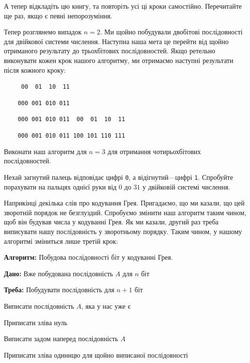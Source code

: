 \documentclass{book}
\newcommand{\algcaption}[1]{\textbf{Алгоритм:} #1.\par}
\newcommand{\alginput}[1]{\textbf{Дано:} #1\par}
\newcommand{\algoutput}[1]{\textbf{Треба:} #1\par}
\newcommand{\algstep}{\item}
\newcommand{\bitstr}[1]{{\tt #1}}
\begin{document}
\begin{exercise}
А тепер відкладіть цю книгу, та повторіть усі ці кроки самостійно. Перечитайте ще раз, якщо є певні непорозуміння.
\end{exercise}

Тепер розглянемо випадок $n=2$.
Ми щойно побудували двобітові послідовності для двійкової системи числення.
Наступна наша мета це перейти від щойно отриманого результату до трьохбітових послідовностей.
Якщо ретельно виконувати кожен крок нашого алгоритму, ми отримаємо наступні результати після кожного кроку:

\par\bitstr{~~~~~00~~01~~10~~11}\par
\par\bitstr{~~~~000~001~010~011}\par
\par\bitstr{~~~~000~001~010~011~~00~~01~~10~~11}\par
\par\bitstr{~~~~000~001~010~011~100~101~110~111}\par

\begin{exercise}
Виконати наш алгоритм для $n=3$ для отримання чотирьохбітових послідовностей.
\end{exercise}

\begin{exercise}
Нехай загнутий палець відповідає цифрі \bitstr{0}, а відігнутий---цифрі \bitstr{1}.
Спробуйте порахувати на пальцях однієї руки від $0$ до $31$ у двійковій системі числення.
\end{exercise}

Наприкінці декілька слів про кодування Грея.
Пригадаємо, що ми казали, що цей зворотній порядок не безглуздий.
Спробуємо змінити наш алгоритм таким чином, щоб він будував числа у кодуванні Грея.
Як ми казали, другий раз треба виписувати нашу послідовність у зворотньому порядку.
Таким чином, у нашому алгоритмі зміниться лише третій крок:

\begin{algorithm}
  \algcaption{Побудова послідовності біт у кодуванні Грея}
  \alginput{Вже побудована послідовність $A$ для $n$ біт}
  \algoutput{Побудувати послідовність для $n+1$ біт}
  \begin{algsteps}
    \algstep Виписати послідовність $A$, яка у нас уже є
    \algstep Приписати зліва нуль
    \algstep Виписати задом наперед послідовність $A$
    \algstep Приписати зліва одиницю для щойно виписаної послідовності
  \end{algsteps}
\end{algorithm}
\end{document}
